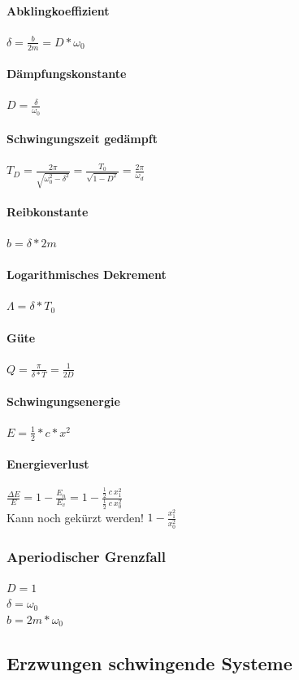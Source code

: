 \documentclass[12pt, a4paper]{scrreprt}
\begin{document}
\paragraph{Abklingkoeffizient} \dotfill \(\delta=\frac{b}{2m}=D*\omega_0\)
\paragraph{Dämpfungskonstante} \dotfill \(D=\frac{\delta}{\omega_0}\)
\paragraph{Schwingungszeit gedämpft} \dotfill \(T_D=\frac{2\pi}{\sqrt{\omega_0^2-\delta^2}}=\frac{T_0}{\sqrt{1-D^2}} = \frac{2\pi}{\omega_d}\)
\paragraph{Reibkonstante} \dotfill \(b=\delta * 2m\)
\paragraph{Logarithmisches Dekrement} \dotfill \(\Lambda=\delta*T_0\)
\paragraph{Güte} \dotfill \(Q=\frac{\pi}{\delta*T}=\frac{1}{2D}\)
\paragraph{Schwingungsenergie} \dotfill \(E = \frac{1}{2}*c*x^2\)
\paragraph{Energieverlust} \dotfill
\(\frac{\Delta E}{E} = 1-\frac{E_n}{E_v}=1-\frac{\frac{1}{2}\ c\ x_1^2}{\frac{1}{2}\ c\ x_0^2}\)\\[1em]
\-\hspace{1.5cm}Kann noch gekürzt werden! \dotfill \(1-\frac{x_1^2}{x_0^2}\)

\subsubsection{Aperiodischer Grenzfall}
\(D=1\)\\
\(\delta=\omega_0\)\\
\(b=2m*\omega_0\)


\subsection{Erzwungen schwingende Systeme}
\end{document}
